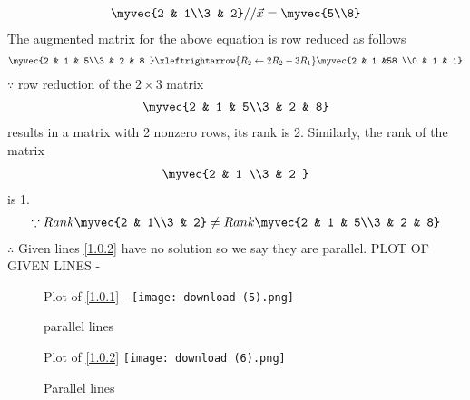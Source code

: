 \documentclass[journal,12pt,twocolumn]{IEEEtran}
\begin{document}
\begin{enumerate}
\begin{align}
\myvec{2 & 1\\3 & 2}
//
\vec{x} = \myvec{5\\8}
\end{align}
%
The augmented matrix for the above equation is row reduced as follows
\begin{align}
\myvec{2 & 1 & 5\\3 & 2 & 8 }
\xleftrightarrow {R_2\leftarrow 2R_2-3R_1}\myvec{2 & 1 &58 \\0 & 1 & 1}
\\
\end{align}
%
$\because$ row reduction of the $2\times 3$ matrix
%
\begin{align}
\myvec{2 & 1 & 5\\3 & 2 & 8}
\end{align}
%
results in a matrix with 2 nonzero rows, its rank is 2. 
%
Similarly, the rank of the matrix 
\begin{align}
\myvec{2 & 1 \\3 & 2 } 
\end{align}
%
is 1.
%
\begin{align}
\because Rank \myvec{2 & 1\\3 & 2} \ne Rank\myvec{2 & 1 & 5\\3 & 2 & 8}\nonumber\\
\end{align}
$\therefore$ Given lines \eqref{1.0.2} have no solution so we say they are parallel.  
PLOT OF GIVEN LINES -
\begin{figure}[ht!]
Plot of \eqref{1.0.1} -
    \centering
    \texttt{[image: download (5).png]}
    \caption{parallel lines}
    \label{fig:SAME LINES.}
\end{figure} 
\begin{figure}[ht]
Plot of \eqref{1.0.2} 
    \centering
   \texttt{[image: download (6).png]}
    \caption{Parallel lines}
    \label{fig: PARALLEL lines.}
\end{figure}    
\end{enumerate}
\end{document}
